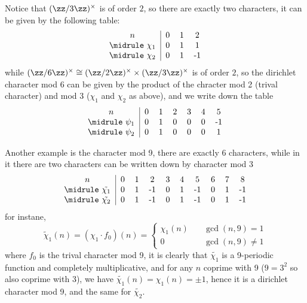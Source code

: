 \begin{example}
    Notice that \((\zz/3\zz)^\times\) is of order \(2\), so there are exactly two characters, it can be given by the following table:
    \[\begin{tabular}{c| c c c c c c}
$n$      &0 &1 &2 \\
\midrule
$\chi_1$ &0 &1 &1 \\
\midrule
$\chi_2$ &0 &1 &-1 \\
\end{tabular}\]
while \((\zz/6\zz)^\times \cong (\zz/2\zz)^\times \times (\zz/3\zz)^\times\) is of order \(2\), so the dirichlet character mod \(6\) can be given by the product of the chracter mod 2 (trival character) and mod 3 (\(\chi_1\) and \(\chi_2\) as above), and we write down the table
\[\begin{tabular}{c|cccccc}
$n$      &0 &1 &2 &3 &4 &5  \\
\midrule
$\psi_1$ &0 &1 &0 &0 &0 &-1 \\
\midrule
$\psi_2$ &0 &1 &0 &0 &0 &1 \\
    
\end{tabular}\]
\end{example}

\begin{example}
    Another example is the character mod 9, there are exactly 6 characters, while in it there are two characters can be written down by character mod 3
    \[\begin{tabular}{c|ccccccccccc}
$n$      &0 &1 &2 &3 &4 &5 &6 &7 &8  \\
\midrule
$\tilde{\chi_1}$ &0 &1 &-1 &0 &1 &-1 &0 &1 &-1 \\
\midrule
$\tilde{\chi_2}$ &0 &1 &-1 &0 &1 &-1 &0 &1 &-1\\
    \end{tabular}\]
    for instane,
    \[\tilde{\chi}_1(n) = (\chi_1 \cdot f_0)(n) = \begin{cases}
\chi_1(n) \quad &\gcd(n,9) = 1 \\
0 \quad &\gcd(n,9) \neq 1
    \end{cases}\]
    where \(f_0\) is the trival character mod 9, it is clearly that \(\tilde{\chi_1}\) is a 9-periodic function and completely multiplicative, and for any \(n\) coprime with 9 (\(9=3^2\) so also coprime with 3), we have \(\tilde{\chi_1}(n) = \chi_1(n) = \pm 1\), hence it is a dirichlet character mod 9, and the same for \(\tilde{\chi_2}\).
\end{example}

